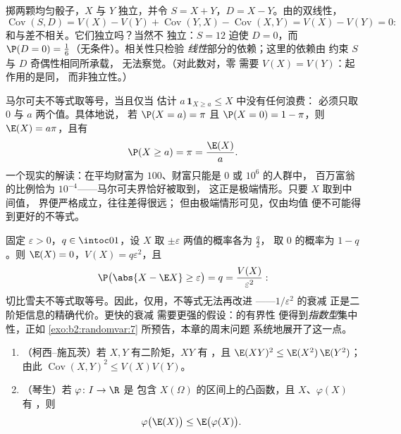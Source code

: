 \begin{example}\label{ex:b2:randomvar:sumdiff}
掷两颗均匀骰子，$X$ 与 $Y$ 独立，并令 $S = X +
Y$，$D = X - Y$。由的双线性，
\[
\operatorname{Cov}(S, D) = V(X) - V(Y) +
\operatorname{Cov}(Y, X) - \operatorname{Cov}(X, Y) = V(X) -
V(Y) = 0 :
\]
和与差不相关。它们独立吗？当然不
独立：$S = 12$ 迫使 $D = 0$，而 $\P(D = 0) =
\frac16$（无条件）。相关性只检验
\emph{线性}部分的依赖；这里的依赖由
约束 $S$ 与 $D$ 奇偶性相同所承载，
无法察觉。（对此数对，零
需要 $V(X) = V(Y)$：起作用的是同，
而非独立性。）
\end{example}

\begin{example}[马尔可夫不等式何时取等]\label{ex:b2:randomvar:markovsharp}
马尔可夫不等式取等号，当且仅当
估计 $a\,\mathbf 1_{X\geq a} \leq X$ 中没有任何浪费：
必须只取 $0$ 与 $a$ 两个值。具体地说，
若 $\P(X = a) = \pi$ 且 $\P(X = 0) = 1 - \pi$，则 $\E(X)
= a\pi$，且有
\[
\P(X \geq a) = \pi = \frac{\E(X)}{a} .
\]
一个现实的解读：在平均财富为
$100$、财富只能是 $0$ 或 $10^6$ 的人群中，
百万富翁的比例恰为 $10^{-4}$——马尔可夫界恰好被取到，
这正是极端情形。只要 $X$ 取到中间值，
界便严格成立，往往差得很远；
但由极端情形可见，仅由均值
便不可能得到更好的不等式。
\end{example}

\begin{example}\label{ex:b2:randomvar:chebsharp}
固定 $\varepsilon > 0$，$q \in \intoc01$，设 $X$ 取
$\pm\varepsilon$ 两值的概率各为 $\frac q2$，
取 $0$ 的概率为 $1 - q$。则 $\E(X) = 0$，$V(X) =
q\varepsilon^2$，且
\[
\P\bigl(\abs{X - \E X} \geq \varepsilon\bigr) = q
= \frac{V(X)}{\varepsilon^2} :
\]
切比雪夫不等式取等号。因此，仅用，不等式无法再改进
——$1/\varepsilon^2$ 的衰减
正是二阶矩信息的精确代价。更快的衰减
需要更强的假设：的有界性
便得到\emph{指数型}集中性，正如
\cref{exo:b2:randomvar:7} 所预告，本章的周末问题
系统地展开了这一点。
\end{example}

\begin{theorem}[柯西--施瓦茨不等式与琴生不等式]\label{thm:b2:randomvar:jensen}
\leavevmode
\begin{enumerate}
\item （柯西--施瓦茨）若 $X, Y$ 有二阶矩，$XY$ 有
，且 $\E(XY)^2 \leq \E(X^2)\,\E(Y^2)$；由此
$\operatorname{Cov}(X,Y)^2 \leq V(X)V(Y)$。
\item （琴生）若 $\varphi \colon I \to \R$ 是
包含 $X(\Omega)$ 的区间上的凸函数，且 $X$、$\varphi(X)$ 有
，则
\[
\varphi\bigl(\E(X)\bigr) \leq \E\bigl(\varphi(X)\bigr) .
\]
\end{enumerate}
\end{theorem}

